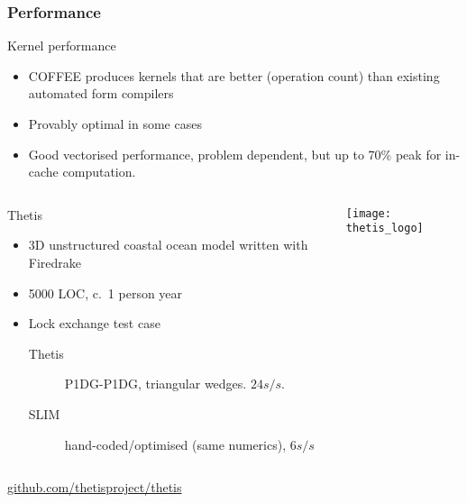 \documentclass[presentation]{beamer}
\begin{document}
\begin{frame}[allowframebreaks]
  \frametitle{Performance}

  \begin{block}{Kernel performance}
    \begin{itemize}
    \item COFFEE produces kernels that are better (operation count)
      than existing automated form compilers
    \item Provably optimal in some cases
    \item Good vectorised performance, problem dependent, but up to
      70\% peak for in-cache computation.
    \end{itemize}
  \end{block}

\pagebreak

  \begin{columns}
    \begin{column}{0.7\textwidth}
      \begin{block}{Thetis}
        \begin{itemize}
        \item 3D unstructured coastal ocean model written with
          Firedrake
        \item 5000 LOC, c.~1 person year
        \item Lock exchange test case
          \begin{description}
          \item[Thetis] P1DG-P1DG, triangular wedges.  $24s/s$.
          \item[SLIM] hand-coded/optimised (same numerics),
            $6s/s$
          \end{description}
        \end{itemize}
      \end{block}
    \end{column}
    \begin{column}[t]{0.3\textwidth}
      \texttt{[image: thetis\_logo]}
    \end{column}
  \end{columns}
  \begin{center}
    \url{github.com/thetisproject/thetis}    
  \end{center}
\end{frame}
\end{document}

